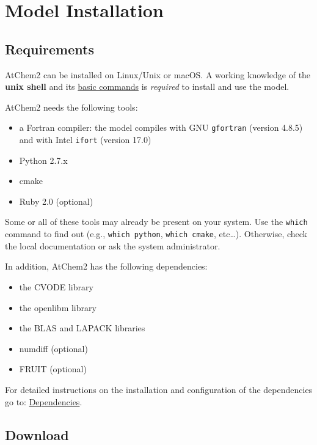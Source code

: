 \chapter{Model Installation} \label{ch:installation}

\section{Requirements} \label{sec:requirements}

AtChem2 can be installed on Linux/Unix or macOS. A working knowledge
of the \textbf{unix shell} and its
\href{https://swcarpentry.github.io/shell-novice/reference/}{basic
  commands} is \emph{required} to install and use the model.

AtChem2 needs the following tools:

\begin{itemize}
\item a Fortran compiler: the model compiles with GNU
  \texttt{gfortran} (version 4.8.5) and with Intel \texttt{ifort}
  (version 17.0)
\item Python 2.7.x
\item cmake
\item Ruby 2.0 (optional)
\end{itemize}

Some or all of these tools may already be present on your system. Use
the \texttt{which} command to find out (e.g., \texttt{which\ python},
\texttt{which\ cmake}, etc\ldots{}). Otherwise, check the local
documentation or ask the system administrator.

In addition, AtChem2 has the following dependencies:

\begin{itemize}
\item the CVODE library
\item the openlibm library
\item the BLAS and LAPACK libraries
\item numdiff (optional)
\item FRUIT (optional)
\end{itemize}

For detailed instructions on the installation and configuration of the
dependencies go to: \hyperref[sec:dependencies]{Dependencies}.

\section{Download} \label{sec:download}

